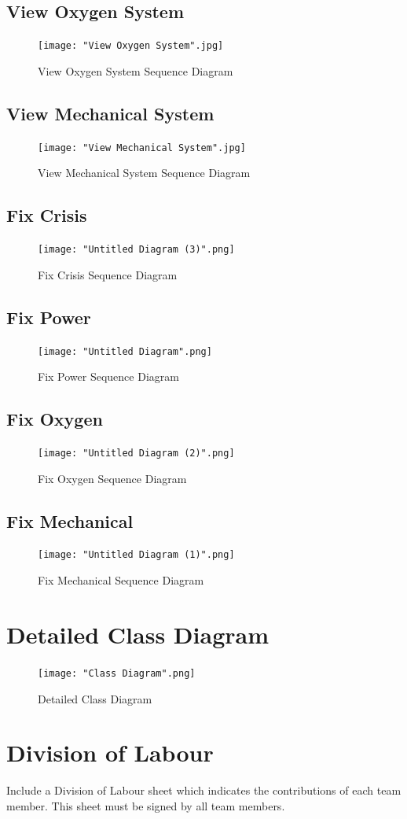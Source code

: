 \documentclass[12pt, titlepage]{article}
\begin{document}
\subsection*{View Oxygen System}
\begin{figure}[H]
\centering
\texttt{[image: "View Oxygen System".jpg]}
\caption{View Oxygen System Sequence Diagram}
\end{figure}
\subsection*{View Mechanical System}
\begin{figure}[H]
\centering
\texttt{[image: "View Mechanical System".jpg]}
\caption{View Mechanical System Sequence Diagram}
\end{figure}
\subsection*{Fix Crisis}
\begin{figure}[H]
\centering
\texttt{[image: "Untitled Diagram (3)".png]}
\caption{Fix Crisis Sequence Diagram}
\end{figure}
\subsection*{Fix Power}
\begin{figure}[H]
\centering
\texttt{[image: "Untitled Diagram".png]}
\caption{Fix Power Sequence Diagram}
\end{figure}
\subsection*{Fix Oxygen}
\begin{figure}[H]
\centering
\texttt{[image: "Untitled Diagram (2)".png]}
\caption{Fix Oxygen Sequence Diagram}
\end{figure}
\subsection*{Fix Mechanical}
\begin{figure}[H]
\centering
\texttt{[image: "Untitled Diagram (1)".png]}
\caption{Fix Mechanical Sequence Diagram}
\end{figure}

\section{Detailed Class Diagram}
\label{sec:detailed_class_diagram}
\begin{figure}[H]
\centering
\texttt{[image: "Class Diagram".png]}
\caption{Detailed Class Diagram}
\end{figure}
\newpage
\appendix
\section{Division of Labour}
\label{sec:division_of_labour}
Include a Division of Labour sheet which indicates the contributions of each team member. This sheet must be signed by all team members.
\end{document}
